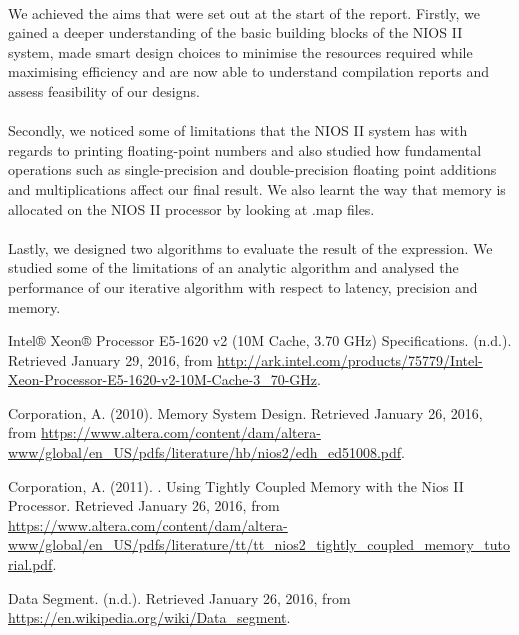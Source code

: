 \documentclass{article}
\begin{document}
\paragraph{}
We achieved the aims that were set out at the start of the report. Firstly, we gained a deeper understanding of the basic building blocks of the NIOS II system, made smart design choices to minimise the resources required while maximising efficiency and are now able to understand compilation reports and assess feasibility of our designs. 
\paragraph{}
Secondly, we noticed some of limitations that the NIOS II system has with regards to printing floating-point numbers and also studied how fundamental operations such as single-precision and double-precision floating point additions and multiplications affect our final result. We also learnt the way that memory is allocated on the NIOS II processor by looking at .map files.
\paragraph{}
Lastly, we designed two algorithms to evaluate the result of the expression. We studied some of the limitations of an analytic algorithm and analysed the performance of our iterative algorithm with respect to latency, precision and memory. 

\newpage
\begin{thebibliography}{99}

 Intel® Xeon® Processor E5-1620 v2 (10M Cache, 3.70 GHz) Specifications. (n.d.). Retrieved January 29, 2016, from \url{ http://ark.intel.com/products/75779/Intel-Xeon-Processor-E5-1620-v2-10M-Cache-3_70-GHz}.

 Corporation, A. (2010). Memory System Design. Retrieved January 26, 2016, from \url{https://www.altera.com/content/dam/altera-www/global/en_US/pdfs/literature/hb/nios2/edh_ed51008.pdf}.

 Corporation, A. (2011). . Using Tightly Coupled Memory with the Nios II Processor. Retrieved January 26, 2016, from \url{https://www.altera.com/content/dam/altera-www/global/en_US/pdfs/literature/tt/tt_nios2_tightly_coupled_memory_tutorial.pdf}.

 Data Segment. (n.d.). Retrieved January 26, 2016, from \url{https://en.wikipedia.org/wiki/Data_segment}.

\end{thebibliography}
\end{document}
